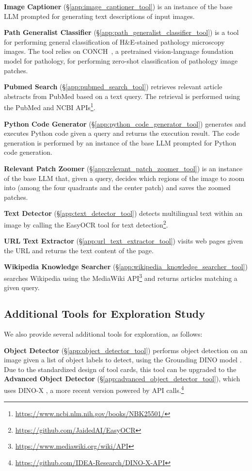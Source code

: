 \textbf{Image Captioner} (\S\ref{app:image_captioner_tool}) is an instance of the base LLM prompted for generating text descriptions of input images.

\textbf{Path Generalist Classifier} (\S\ref{app:path_generalist_classifier_tool}) is a tool for performing general classification of H\&E-stained pathology microscopy images. The tool relies on CONCH~\cite{lu2024avisionlanguage}, a pretrained vision-language foundation model for pathology, for performing zero-shot classification of pathology image patches.

\textbf{Pubmed Search} (\S\ref{app:pubmed_search_tool}) retrieves relevant article abstracts from PubMed based on a text query. The retrieval is performed using the PubMed and NCBI APIs\footnote{\url{https://www.ncbi.nlm.nih.gov/books/NBK25501/}}. 

\textbf{Python Code Generator} (\S\ref{app:python_code_generator_tool}) generates and executes Python code given a query and returns the execution result. The code generation is performed by an instance of the base LLM prompted for Python code generation. 

\textbf{Relevant Patch Zoomer} (\S\ref{app:relevant_patch_zoomer_tool}) is an instance of the base LLM that, given a query, decides which regions of the image to zoom into (among the four quadrants and the center patch) and saves the zoomed patches.

\textbf{Text Detector} (\S\ref{app:text_detector_tool}) detects multilingual text within an image by calling the EasyOCR tool for text detection\footnote{\url{https://github.com/JaidedAI/EasyOCR}}.

\textbf{URL Text Extractor} (\S\ref{app:url_text_extractor_tool}) visits web pages given the URL and returns the text content of the page.

\textbf{Wikipedia Knowledge Searcher} (\S\ref{app:wikipedia_knowledge_searcher_tool}) searches Wikipedia using the MediaWiki API\footnote{\url{https://www.mediawiki.org/wiki/API}} and returns articles matching a given query.

\subsection{Additional Tools for Exploration Study}

We also provide several additional tools for exploration, as follows:

\textbf{Object Detector} (\S\ref{app:object_detector_tool}) performs object detection on an image given a list of object labels to detect, using the Grounding DINO model \cite{caron2021emerging}. Due to the standardized design of tool cards, this tool can be upgraded to the \textbf{Advanced Object Detector} (\S\ref{app:advanced_object_detector_tool}), which uses DINO-X \cite{ren2024dinoxunifiedvisionmodel}, a more recent version powered by API calls.\footnote{\url{https://github.com/IDEA-Research/DINO-X-API}}

